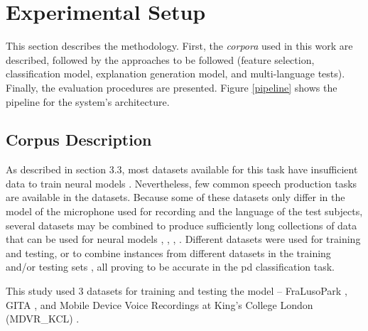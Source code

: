 
\chapter{Experimental Setup}
\label{ch:adipisci}



This section describes the methodology. First, the \textit{corpora} used in this work are described, followed by the approaches to be followed (feature selection, classification model, explanation generation model, and multi-language tests). Finally, the evaluation procedures are presented. Figure \ref{pipeline} shows the pipeline for the system's architecture. 

\section{Corpus Description}

As described in section 3.3, most datasets available for this task have insufficient data to train neural models \cite{underfitting_small_datasets}. Nevertheless, few common speech production tasks are available in the datasets. Because some of these datasets only differ in
the model of the microphone used for recording and the language of the test subjects, several datasets may be combined to produce sufficiently long collections of data that can be used for neural models \cite{parkinson_braga}, \cite{parkinson_acoustic_despotovic}, \cite{parkinson_phonemic_relevance}, \cite{x_vector_parkinson}. Different datasets were used for training and testing, or to combine instances from different datasets in the training and/or testing sets \cite{parkinson_three_languages}, all proving to be accurate in the \gls{pd} classification task.

This study used 3 datasets for training and testing the model -- FraLusoPark \cite{fralusopark}, GITA \cite{GITA}, and Mobile Device Voice Recordings at King's College London (MDVR\_KCL) \cite{MDVR}.

